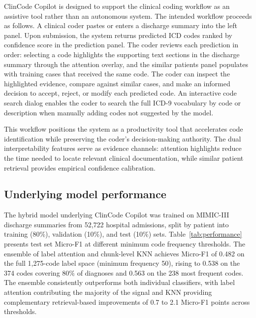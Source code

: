 \documentclass[conference]{IEEEtran}
\begin{document}
ClinCode Copilot is designed to support the clinical coding workflow as an assistive tool rather than an autonomous system. The intended workflow proceeds as follows. A clinical coder pastes or enters a discharge summary into the left panel. Upon submission, the system returns predicted ICD codes ranked by confidence score in the prediction panel. The coder reviews each prediction in order: selecting a code highlights the supporting text sections in the discharge summary through the attention overlay, and the similar patients panel populates with training cases that received the same code. The coder can inspect the highlighted evidence, compare against similar cases, and make an informed decision to accept, reject, or modify each predicted code. An interactive code search dialog enables the coder to search the full ICD-9 vocabulary by code or description when manually adding codes not suggested by the model.

This workflow positions the system as a productivity tool that accelerates code identification while preserving the coder's decision-making authority. The dual interpretability features serve as evidence channels: attention highlights reduce the time needed to locate relevant clinical documentation, while similar patient retrieval provides empirical confidence calibration.

\subsection{Underlying model performance}

The hybrid model underlying ClinCode Copilot was trained on MIMIC-III~\cite{b_mimic} discharge summaries from 52,722 hospital admissions, split by patient into training (80\%), validation (10\%), and test (10\%) sets. Table~\ref{tab:performance} presents test set Micro-F1 at different minimum code frequency thresholds. The ensemble of label attention and chunk-level KNN achieves Micro-F1 of 0.482 on the full 1,275-code label space (minimum frequency 50), rising to 0.538 on the 374 codes covering 80\% of diagnoses and 0.563 on the 238 most frequent codes. The ensemble consistently outperforms both individual classifiers, with label attention contributing the majority of the signal and KNN providing complementary retrieval-based improvements of 0.7 to 2.1 Micro-F1 points across thresholds.
\end{document}

